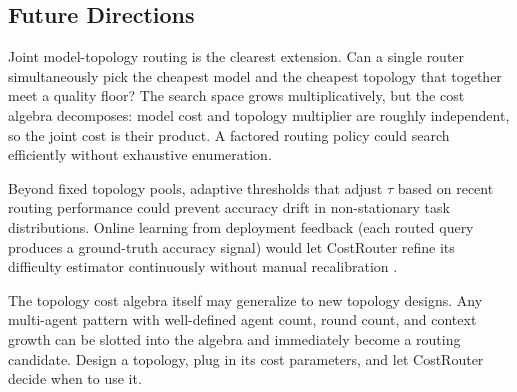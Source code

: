 \subsection{Future Directions}\label{future-directions}

Joint model-topology routing is the clearest extension. Can a single router simultaneously pick the cheapest model and the cheapest topology that together meet a quality floor? The search space grows multiplicatively, but the cost algebra decomposes: model cost and topology multiplier are roughly independent, so the joint cost is their product. A factored routing policy could search efficiently without exhaustive enumeration.

Beyond fixed topology pools, adaptive thresholds that adjust $\tau$ based on recent routing performance could prevent accuracy drift in non-stationary task distributions. Online learning from deployment feedback (each routed query produces a ground-truth accuracy signal) would let CostRouter refine its difficulty estimator continuously without manual recalibration \cite{ong_2024, aflow_2025}.

The topology cost algebra itself may generalize to new topology designs. Any multi-agent pattern with well-defined agent count, round count, and context growth can be slotted into the algebra and immediately become a routing candidate. Design a topology, plug in its cost parameters, and let CostRouter decide when to use it.
